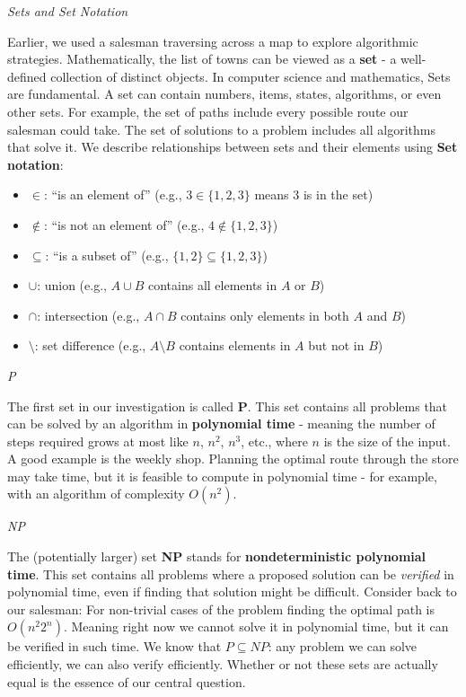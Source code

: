 \documentclass[12pt]{report}
\begin{document}
\begin{center}
    \vspace{0cm}
    {\Large\itshape Sets and Set Notation\par}
\end{center}
Earlier, we used a salesman traversing across a map to explore algorithmic strategies.
Mathematically, the list of towns can be viewed as a \textbf{set} - a well-defined collection of distinct objects.
In computer science and mathematics, Sets are fundamental.
A set can contain numbers, items, states, algorithms, or even other sets.
For example, the set of paths include every possible route our salesman could take.
The set of solutions to a problem includes all algorithms that solve it.
We describe relationships between sets and their elements using \textbf{Set notation}:
\begin{itemize}
    \item $\in$: “is an element of” (e.g., $3 \in \{1, 2, 3\}$ means 3 is in the set)
    \item $\notin$: “is not an element of” (e.g., $4 \notin \{1, 2, 3\}$)
    \item $\subseteq$: “is a subset of” (e.g., $\{1,2\} \subseteq \{1,2,3\}$)
    \item $\cup$: union (e.g., $A \cup B$ contains all elements in $A$ or $B$)
    \item $\cap$: intersection (e.g., $A \cap B$ contains only elements in both $A$ and $B$)
    \item $\setminus$: set difference (e.g., $A \setminus B$ contains elements in $A$ but not in $B$)
\end{itemize}

\begin{center}
    \vspace{0cm}
    {\Large\itshape P\par}
\end{center}
The first set in our investigation is called \textbf{P}.
This set contains all problems that can be solved by an algorithm in \textbf{polynomial time} - meaning the number of steps required grows at most like $n$, $n^2$, $n^3$, etc., where $n$ is the size of the input.
A good example is the weekly shop.
Planning the optimal route through the store may take time, but it is feasible to compute in polynomial time - for example, with an algorithm of complexity $O(n^2)$.

\begin{center}
    \vspace{0cm}
    {\Large\itshape NP\par}
\end{center}
The (potentially larger) set \textbf{NP} stands for \textbf{nondeterministic polynomial time}. This set contains all problems where a proposed solution can be \textit{verified} in polynomial time, even if finding that solution might be difficult.
Consider back to our salesman: For non-trivial cases of the problem finding the optimal path is \( O(n^2 2^n) \).
Meaning right now we cannot solve it in polynomial time, but it can be verified in such time.
We know that $P \subseteq NP$: any problem we can solve efficiently, we can also verify efficiently.
Whether or not these sets are actually equal is the essence of our central question.
\end{document}
